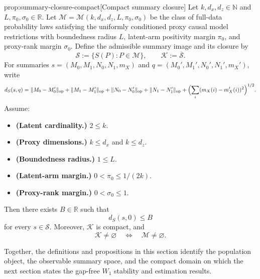 \begin{propositionv}{prop:summary-closure-compact}[Compact summary closure]
Let \(k,d_x,d_z\in\mathbb N\) and \(L,\pi_0,\sigma_0\in\mathbb R\). Let \(\mathcal M=\mathcal M(k,d_x,d_z,L,\pi_0,\sigma_0)\) be the class of full-data probability laws satisfying the uniformly conditioned proxy causal model restrictions with boundedness radius \(L\), latent-arm positivity margin \(\pi_0\), and proxy-rank margin \(\sigma_0\). Define the admissible summary image and its closure by
\[
\mathscr S:=\{S(P):P\in\mathcal M\},
\qquad
\mathcal K:=\overline{\mathscr S}.
\]
For summaries \(s=(M_0,M_1,N_0,N_1,m_X)\) and \(q=(M_0',M_1',N_0',N_1',m_X')\), write
\[
d_S(s,q)
=
\|M_0-M_0'\|_{\mathrm{op}}
+\|M_1-M_1'\|_{\mathrm{op}}
+\|N_0-N_0'\|_{\mathrm{op}}
+\|N_1-N_1'\|_{\mathrm{op}}
+\Bigl(\sum_i (m_X(i)-m_X'(i))^2\Bigr)^{1/2}.
\]
Assume:
\begin{itemize}
\item \textbf{(Latent cardinality.)} \(2\le k\).
\item \textbf{(Proxy dimensions.)} \(k\le d_x\) and \(k\le d_z\).
\item \textbf{(Boundedness radius.)} \(1\le L\).
\item \textbf{(Latent-arm margin.)} \(0<\pi_0\le 1/(2k)\).
\item \textbf{(Proxy-rank margin.)} \(0<\sigma_0\le 1\).
\end{itemize}
Then there exists \(B\in\mathbb R\) such that
\[
d_S(s,0)\le B
\]
for every \(s\in\mathscr S\). Moreover, \(\mathcal K\) is compact, and
\[
\mathcal K\ne\varnothing
\quad\Longleftrightarrow\quad
\mathcal M\ne\varnothing .
\]
\end{propositionv}

Together, the definitions and propositions in this section identify the population object, the observable summary space, and the compact domain on which the next section states the gap-free \(W_1\) stability and estimation results.
